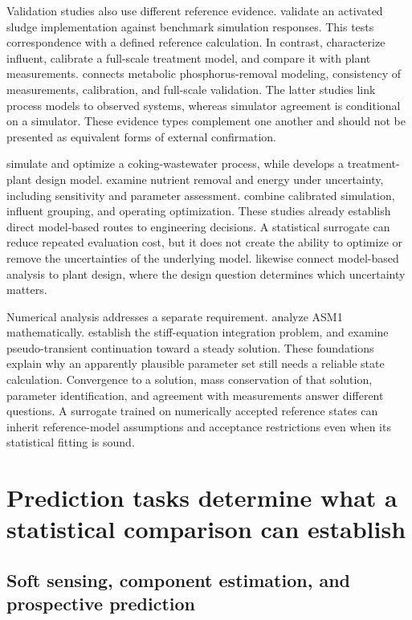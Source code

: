 Validation studies also use different reference evidence. \citet{Calise2020} validate an activated sludge implementation against benchmark simulation responses. This tests correspondence with a defined reference calculation. In contrast, \citet{SadriMoghaddam2021} characterize influent, calibrate a full-scale treatment model, and compare it with plant measurements. \citet{Meijer2004} connects metabolic phosphorus-removal modeling, consistency of measurements, calibration, and full-scale validation. The latter studies link process models to observed systems, whereas simulator agreement is conditional on a simulator. These evidence types complement one another and should not be presented as equivalent forms of external confirmation.

\citet{Wu2016} simulate and optimize a coking-wastewater process, while \citet{Jasim2020} develops a treatment-plant design model. \citet{Szelag2022} examine nutrient removal and energy under uncertainty, including sensitivity and parameter assessment. \citet{Nazif2023} combine calibrated simulation, influent grouping, and operating optimization. These studies already establish direct model-based routes to engineering decisions. A statistical surrogate can reduce repeated evaluation cost, but it does not create the ability to optimize or remove the uncertainties of the underlying model. \citet{Rivas2008} likewise connect model-based analysis to plant design, where the design question determines which uncertainty matters.

Numerical analysis addresses a separate requirement. \citet{Nelson2009} analyze ASM1 mathematically. \citet{CurtissHirschfelder1952} establish the stiff-equation integration problem, and \citet{KelleyKeyes1998} examine pseudo-transient continuation toward a steady solution. These foundations explain why an apparently plausible parameter set still needs a reliable state calculation. Convergence to a solution, mass conservation of that solution, parameter identification, and agreement with measurements answer different questions. A surrogate trained on numerically accepted reference states can inherit reference-model assumptions and acceptance restrictions even when its statistical fitting is sound.

\section{Prediction tasks determine what a statistical comparison can establish}

\subsection{Soft sensing, component estimation, and prospective prediction}

